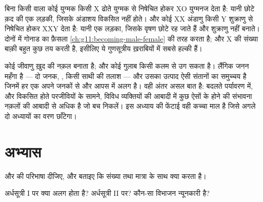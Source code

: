 \begin{example}[लिंग गुणसूत्र ग़लत गिने गए]\label{ex:g12:meiosis-genetic-shuffling:sexchrom}
बिना किसी  वाला कोई युग्मक किसी X ढोते युग्मक से निषेचित होकर
XO युग्मनज देता है: यानी छोटे क़द की एक लड़की, जिसके अंडाशय विकसित नहीं
होते। और कोई XX अंडाणु किसी Y शुक्राणु से निषेचित होकर XXY देता है: यानी एक
लड़का, जिसके वृषण छोटे रह जाते हैं और शुक्राणु नहीं बनाते। दोनों में 
गोनाड का फ़ैसला \cref{ch:g11:becoming-male-female} की तरह करता है; और X
 की संख्या बाक़ी बहुत कुछ तय करती है, इसीलिए ये गुणसूत्रीय
ख़राबियों में सबसे हल्की हैं।
\end{example}

\begin{remark}[लैंगिकता क्यों]\label{rem:g12:meiosis-genetic-shuffling:whysex}
कोई जीवाणु ख़ुद की नक़ल बनाता है; और कोई गुलाब किसी कलम से उग सकता है।
लैंगिक जनन महँगा है --- दो जनक, , किसी साथी की तलाश ---
और उसका उत्पाद ऐसी संतानों का समुच्चय है जिनमें हर एक अपने जनकों से और आपस
में अलग है। वही अंतर असल बात है: बदलते पर्यावरण में, और विकसित होते परजीवियों
के सामने, विविध व्यक्तियों की आबादी में कुछ ऐसों के होने की संभावना नक़लों
की आबादी से अधिक है जो बच निकलें। इस अध्याय की फेंटाई वही कच्चा माल है जिसे
अगले दो अध्यायों का वरण छाँटेगा।
\end{remark}

\section{अभ्यास}

\begin{exercise}[$\star$]\label{exo:g12:meiosis-genetic-shuffling:1}
 और  की परिभाषा दीजिए, और बताइए कि  
संख्या तथा  मात्रा के साथ क्या करता है।
\end{exercise}

\begin{exercise}[$\star$]\label{exo:g12:meiosis-genetic-shuffling:2}
अर्धसूत्री I पर क्या अलग होता है? अर्धसूत्री II पर? कौन-सा विभाजन न्यूनकारी
है?
\end{exercise}

